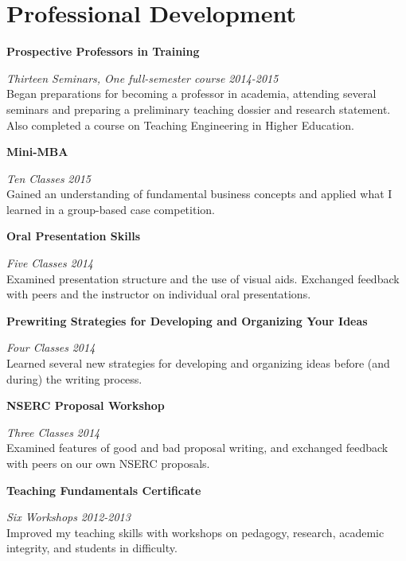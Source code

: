 \section{\sc Professional Development}

{\bf Prospective Professors in Training}
\vspace{-.3cm}

{\em Thirteen Seminars, One full-semester course} \hfill {\em 2014-2015}\\
Began preparations for becoming a professor in academia, attending several seminars and preparing a preliminary teaching dossier and research statement.
Also completed a course on Teaching Engineering in Higher Education.

{\bf Mini-MBA}
\vspace{-.3cm}

{\em Ten Classes} \hfill {\em 2015}\\
Gained an understanding of fundamental business concepts and applied what I learned in a group-based case competition.

{\bf Oral Presentation Skills}
\vspace{-.3cm}

{\em Five Classes} \hfill {\em 2014}\\
Examined presentation structure and the use of visual aids. Exchanged feedback with peers and the instructor on individual oral presentations.

{\bf Prewriting Strategies for Developing and Organizing Your Ideas}
\vspace{-.3cm}

{\em Four Classes} \hfill {\em 2014}\\
Learned several new strategies for developing and organizing ideas before (and during) the writing process.

{\bf NSERC Proposal Workshop}
\vspace{-.3cm}

{\em Three Classes} \hfill {\em 2014}\\
Examined features of good and bad proposal writing, and exchanged feedback with peers on our own NSERC proposals.

{\bf Teaching Fundamentals Certificate}
\vspace{-.3cm}

{\em Six Workshops} \hfill {\em 2012-2013}\\
Improved my teaching skills with workshops on pedagogy, research, academic integrity, and students in difficulty.
